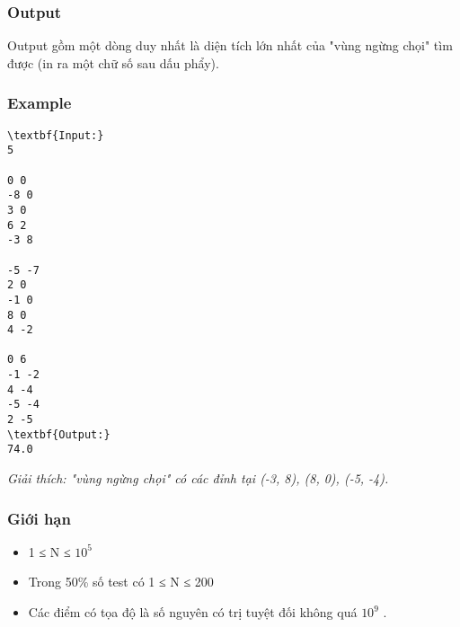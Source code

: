 \subsubsection{   Output  }

   Output gồm một dòng duy nhất là diện tích lớn nhất của "vùng ngừng chọi" tìm được (in ra một chữ số sau dấu phẩy).  

\subsubsection{   Example  }
\begin{verbatim}
\textbf{Input:}
5

0 0
-8 0
3 0
6 2
-3 8

-5 -7
2 0
-1 0
8 0
4 -2

0 6
-1 -2
4 -4
-5 -4
2 -5
\textbf{Output:}
74.0\end{verbatim}

\emph{    Giải thích: "vùng ngừng chọi" có các đỉnh tại (-3, 8), (8, 0), (-5, -4).   }

\subsubsection{   Giới hạn  }
\begin{itemize}
	\item     1 ≤ N ≤ $10^{5}$
	\item     Trong 50\% số test có 1 ≤ N ≤ 200   
	\item     Các điểm có tọa độ là số nguyên có trị tuyệt đối không quá $10^{9}$    .   
\end{itemize}
